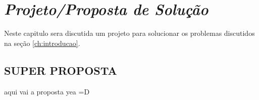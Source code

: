 \chapter{\textit{Projeto/Proposta de Solução}}
	\label{ch:proposta}
Neste capitulo sera discutida um projeto para solucionar os problemas discutidos na seção \ref{ch:introducao}.   

\section{SUPER PROPOSTA}
aqui vai a proposta yea =D